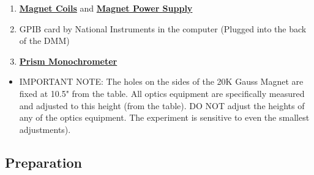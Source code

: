 \documentclass{../lab}
\begin{document}
\begin{enumerate}
    \item \href{http://physics111.lib.berkeley.edu/Physics111/Reprints/ATM/Zee\_Magnet.jpg}{\textbf{Magnet Coils}} and \href{http://physics111.lib.berkeley.edu/Physics111/Reprints/ATM/DC\_Mag\_Pwr.jpg}{\textbf{Magnet Power Supply}}

    \item GPIB card by National Instruments in the computer (Plugged into the back of the DMM)

    \item \href{http://physics111.lib.berkeley.edu/Physics111/Reprints/ATM/Prism\_Mono.jpg}{\textbf{Prism Monochrometer}}

\end{enumerate}

\begin{itemize}
    \item IMPORTANT NOTE: The holes on the sides of the 20K Gauss Magnet are fixed at 10.5" from the table. All optics equipment are specifically measured and adjusted to this height (from the table). DO NOT adjust the heights of any of the optics equipment. The experiment is sensitive to even the smallest adjustments).

\end{itemize}

\subsection{Preparation}
\end{document}
